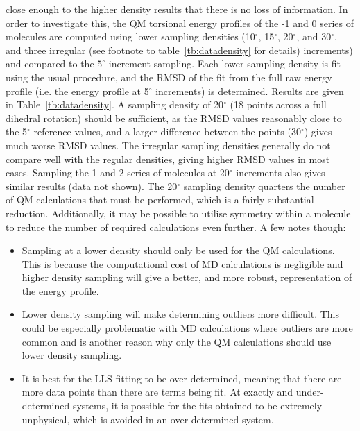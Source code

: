 \documentclass[11pt, oneside]{article}   	%
\begin{document}
close enough to the higher density results that there is no loss of information. In order to investigate this, the QM torsional energy profiles of the -1 and 0 series of molecules are computed using lower sampling densities (10$^{\circ}$, 15$^{\circ}$, 20$^{\circ}$, and 30$^{\circ}$, and three irregular (see footnote to table~\ref{tb:datadensity} for details) increments) and compared to the $5^{\circ}$ increment sampling. Each lower sampling density is fit using the usual procedure, and the RMSD of the fit from the full raw energy profile (i.e. the energy profile at 5$^\circ$ increments) is determined. Results are given in Table~\ref{tb:datadensity}. A sampling density of 20$^{\circ}$ (18 points across a full dihedral rotation) should be sufficient, as the RMSD values reasonably close to the 5$^\circ$ reference values, and a larger difference between the points (30$^\circ$) gives much worse RMSD values. The irregular sampling densities generally do not compare well with the regular densities, giving higher RMSD values in most cases. Sampling the 1 and 2 series of molecules at 20$^\circ$ increments also gives similar results (data not shown). The 20$^\circ$ sampling density quarters the number of QM calculations that must be performed, which is a fairly substantial reduction. Additionally, it may be possible to utilise symmetry within a molecule to reduce the number of required calculations even further. A few notes though:
\begin{itemize}
\item Sampling at a lower density should only be used for the QM calculations. This is because the computational cost of MD calculations is negligible and higher density sampling will give a better, and more robust, representation of the energy profile.
\item Lower density sampling will make determining outliers more difficult. This could be especially problematic with MD calculations where outliers are more common and is another reason why only the QM calculations should use lower density sampling.
\item It is best for the LLS fitting to be over-determined, meaning that there are more data points than there are terms being fit. At exactly and under-determined systems, it is possible for the fits obtained to be extremely unphysical, which is avoided in an over-determined system.
\end{itemize}
\end{document}
